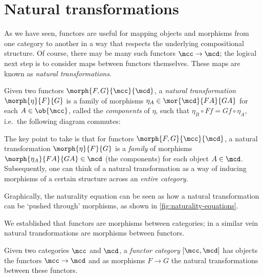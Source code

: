 \section{Natural transformations}

As we have seen, functors are useful for mapping objects and morphisms from one
category to another in a way that respects the underlying compositional
structure.
Of course, there may be many such functors \(\mcc \to \mcd\); the logical next
step is to consider maps between functors themselves.
These maps are known as \emph{natural transformations}.

\begin{definition}
    Given two functors \(\morph{F, G}{\mcc}{\mcd}\), a
    \emph{natural transformation} \(\morph{\eta}{F}{G}\) is a family of
    morphisms \(
    \eta_A \in \mor{\mcd}{FA}{GA}
    \) for each \(A \in \ob{\mcc}\), called the \emph{components} of \(\eta\),
    such that \(
    \eta_B \circ Ff = Gf \circ \eta_A
    \), i.e.\ the following diagram commutes:
    \begin{center}
        
    \end{center}
\end{definition}

The key point to take is that for functors \(\morph{F,G}{\mcc}{\mcd}\), a
natural transformation \(\morph{\eta}{F}{G}\) is a \emph{family} of morphisms
\(\morph{\eta_A}{FA}{GA} \in \mcd\) (the components) for each object
\(A \in \mcd\).
Subsequently, one can think of a natural transformation as a way of inducing
morphisms of a certain structure across an \emph{entire category}.

Graphically, the naturality equation can be seen as how a natural transformation
can be `pushed through' morphisms, as shown in \cref{fig:naturality-equations}.



We established that functors are morphisms between categories; in a similar
vein natural transformations are morphisms between functors.

\begin{definition}
    Given two categories \(\mcc\) and \(\mcd\), a \emph{functor category}
    \([\mcc,\mcd]\) has objects the functors \(\mcc \to \mcd\) and as morphisms
    \(F \to G\) the natural transformations between these functors.
\end{definition}

